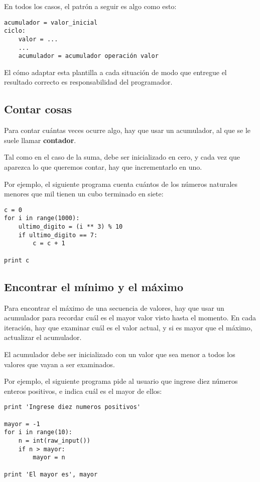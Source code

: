 En todos los casos, el patrón a seguir es algo como esto:

\begin{lstlisting}
acumulador = valor_inicial
ciclo:
    valor = ...
    ...
    acumulador = acumulador operación valor
\end{lstlisting}

El cómo adaptar esta plantilla a cada situación de modo que entregue el
resultado correcto es responsabilidad del programador.

\subsection{Contar cosas}

Para contar cuántas veces ocurre algo, hay que usar un acumulador, al
que se le suele llamar \textbf{contador}.

Tal como en el caso de la suma, debe ser inicializado en cero, y cada
vez que aparezca lo que queremos contar, hay que incrementarlo en uno.

Por ejemplo, el siguiente programa cuenta cuántos de los números
naturales menores que mil tienen un cubo terminado en siete:

\begin{lstlisting}
c = 0
for i in range(1000):
    ultimo_digito = (i ** 3) % 10
    if ultimo_digito == 7:
        c = c + 1

print c
\end{lstlisting}

\subsection{Encontrar el mínimo y el máximo}

Para encontrar el máximo de una secuencia de valores, hay que usar un
acumulador para recordar cuál es el mayor valor visto hasta el momento.
En cada iteración, hay que examinar cuál es el valor actual, y si es
mayor que el máximo, actualizar el acumulador.

El acumulador debe ser inicializado con un valor que sea menor a todos
los valores que vayan a ser examinados.

Por ejemplo, el siguiente programa pide al usuario que ingrese diez
números enteros positivos, e indica cuál es el mayor de ellos:

\begin{lstlisting}
print 'Ingrese diez numeros positivos'

mayor = -1
for i in range(10):
    n = int(raw_input())
    if n > mayor:
        mayor = n

print 'El mayor es', mayor
\end{lstlisting}

